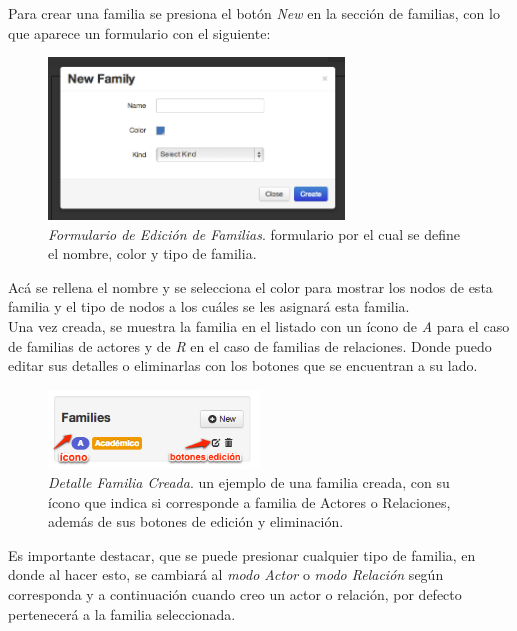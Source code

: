 Para crear una familia se presiona el botón \emph{New} en la sección de familias, con lo que aparece un formulario con el siguiente:

\begin{figure}[H]
  \centering
  \includegraphics[width=0.7\textwidth]{images/edicion_familias.png}
  \caption[Formulario de Edición de Familias]{\emph{Formulario de Edición de Familias}. formulario por el cual se define el nombre, color y tipo de familia.}
  \label{edicion_familias}
\end{figure}

Acá se rellena el nombre y se selecciona el color para mostrar los nodos de esta familia y el tipo de nodos a los cuáles se les asignará esta familia.\\

Una vez creada, se muestra la familia en el listado con un ícono de \emph{A} para el caso de familias de actores y de \emph{R} en el caso de familias de relaciones. Donde puedo editar sus detalles o eliminarlas con los botones que se encuentran a su lado.

\begin{figure}[H]
  \centering
  \includegraphics[width=0.5\textwidth]{images/familia_creada.png}
  \caption[Detalle Familia Creada]{\emph{Detalle Familia Creada}. un ejemplo de una familia creada, con su ícono que indica si corresponde a familia de Actores o Relaciones, además de sus botones de edición y eliminación.}
  \label{familia_creada}
\end{figure}

Es importante destacar, que se puede presionar cualquier tipo de familia, en donde al hacer esto, se cambiará al \emph{modo Actor} o \emph{modo Relación} según corresponda y a continuación cuando creo un actor o relación, por defecto pertenecerá a la familia seleccionada.

